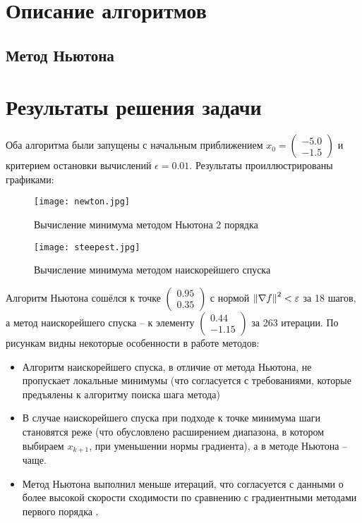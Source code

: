 \documentclass[main.tex]{subfiles}
\begin{document}
\section{Описание алгоритмов}

\subsection{Метод Ньютона}

\section{Результаты решения задачи}
Оба алгоритма были запущены с начальным приближением $x_0=\begin{pmatrix}-5.0\\-1.5\end{pmatrix}$ и критерием остановки вычислений $\epsilon = 0.01$. Результаты проиллюстрированы графиками:
\begin{figure}[H]
	\centering \texttt{[image: newton.jpg]}
	\caption{Вычисление минимума методом Ньютона 2 порядка}
	\label{im:newton}
\end{figure}
\begin{figure}[h]
	\centering \texttt{[image: steepest.jpg]}
	\caption{Вычисление минимума методом наискорейшего спуска}
	\label{im:steepest}
\end{figure}

Алгоритм Ньютона сошёлся к точке $\begin{pmatrix}0.95\\0.35\end{pmatrix}$ с нормой $\left\lVert\nabla f\right\rVert^2 < \varepsilon$ за 18 шагов, а метод наискорейшего спуска -- к элементу $\begin{pmatrix}0.44\\-1.15\end{pmatrix}$ за 263 итерации. По рисункам видны некоторые особенности в работе методов:
\begin{itemize}
	\item Алгоритм наискорейшего спуска, в отличие от метода Ньютона, не пропускает локальные минимумы (что согласуется с требованиями, которые предъялены к алгоритму поиска шага метода)
	\item В случае наискорейшего спуска при подходе к точке минимума шаги становятся реже (что обусловлено расширением диапазона, в котором выбираем $x_{k+1}$, при уменьшении нормы градиента), а в методе Ньютона -- чаще.
	\item Метод Ньютона выполнил меньше итераций, что согласуется с данными о более высокой скорости сходимости по сравнению с градиентными методами первого порядка \cite{boldirev}.
\end{itemize}
\end{document}

